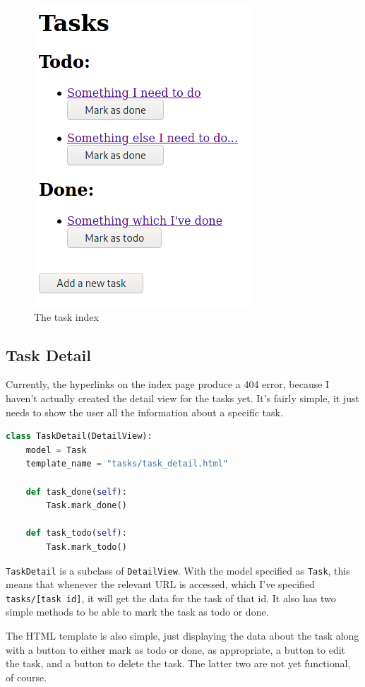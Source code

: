 \documentclass{article}
\begin{document}
\begin{figure}[H]
  \centering
  \includegraphics[width=0.6\linewidth]{Screenshots/task_index.png}
  \caption{The task index}
  \label{fig:task_index1}
\end{figure}

\subsection{Task Detail}
Currently,
the hyperlinks on the index page produce a 404 error,
because I haven't actually created the detail view for the tasks yet.
It's fairly simple,
it just needs to show the user all the information about a specific task.

\begin{lstlisting}[language=Python, breaklines]
class TaskDetail(DetailView):
    model = Task
    template_name = "tasks/task_detail.html"

    def task_done(self):
        Task.mark_done()

    def task_todo(self):
        Task.mark_todo()
\end{lstlisting}

\texttt{TaskDetail} is a subclass of \texttt{DetailView}.
With the model specified as \texttt{Task},
this means that whenever the relevant URL is accessed,
which I've specified \texttt{tasks/[task id]},
it will get the data for the task of that id.
It also has two simple methods to be able to mark the task as todo or done.

The HTML template is also simple,
just displaying the data about the task along with a button to either mark as todo or done,
as appropriate,
a button to edit the task,
and a button to delete the task.
The latter two are not yet functional,
of course.
\end{document}
